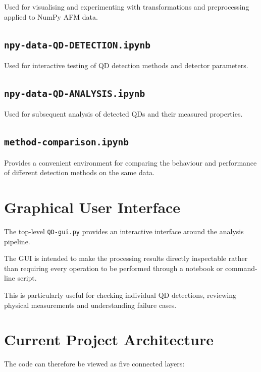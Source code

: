 \documentclass[11pt,a4paper]{article}
\begin{document}
Used for visualising and experimenting with transformations and preprocessing applied to NumPy AFM data.

\subsection{\texttt{npy-data-QD-DETECTION.ipynb}}

Used for interactive testing of QD detection methods and detector parameters.

\subsection{\texttt{npy-data-QD-ANALYSIS.ipynb}}

Used for subsequent analysis of detected QDs and their measured properties.

\subsection{\texttt{method-comparison.ipynb}}

Provides a convenient environment for comparing the behaviour and performance of different detection methods on the same data.


\section{Graphical User Interface}

The top-level \texttt{QD-gui.py} provides an interactive interface around the analysis pipeline.

The GUI is intended to make the processing results directly inspectable rather than requiring every operation to be performed through a notebook or command-line script.

This is particularly useful for checking individual QD detections, reviewing physical measurements and understanding failure cases.



\section{Current Project Architecture}

The code can therefore be viewed as five connected layers:
\end{document}
